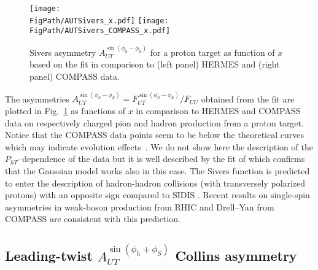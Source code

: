 \documentclass[a4paper,11pt]{article}
\newcommand*{\FigPath}{./figs}%
\begin{document}
\begin{figure}[t!]
\centering
\texttt{[image: \\FigPath/AUTSivers\_x.pdf]}  \hspace{5mm}
\texttt{[image: \\FigPath/AUTSivers\_COMPASS\_x.pdf]}
\caption{\label{aut_f1t_jlab} Sivers asymmetry
	$A_{UT}^{\sin(\phi_h-\phi_S)}$ for a proton target as function of $ x $
	based on the fit \cite{Anselmino:2011gs} in comparison to
	(left panel) HERMES \cite{Airapetian:2009ae}
	and (right panel) COMPASS  \cite{Adolph:2012sp} data.}
\end{figure}

The asymmetries $A_{UT}^{\sin(\phi_h-\phi_S)}= F_{UT}^{\sin(\phi_h-\phi_S)}/F_{UU}$
obtained from the fit \cite{Anselmino:2011gs}
are plotted in Fig.~\ref{aut_f1t_jlab} as functions of $x$ in comparison
to HERMES \cite{Airapetian:2009ae} and COMPASS \cite{Adolph:2012sp} data
on respectively charged pion and hadron production from a proton target.
	Notice that the COMPASS data points seem to be below the
	theoretical curves which may indicate evolution
	effects~\cite{Aybat:2011ta,Anselmino:2012aa}.
We do not show here the description of the $P_{hT}$--dependence of the
data but it is well described by the fit of \cite{Anselmino:2011gs}
which confirms that the Gaussian model works also in this case.
The Sivers function is predicted to enter the description of hadron-hadron 
collisions (with transversely polarized protons) with an opposite sign 
compared to SIDIS \cite{Collins:2002kn,Brodsky:2002cx,Brodsky:2002rv}.
Recent results on single-spin asymmetries in weak-boson production 
from RHIC \cite{Adamczyk:2015gyk} and Drell--Yan from COMPASS 
\cite{Aghasyan:2017jop,Parsamyan:2018zju} are consistent 
with this prediction.



\subsection{\boldmath Leading-twist $A_{UT}^{\sin(\phi_h+\phi_S)}$ Collins asymmetry}
\label{Sec-5.4:Collins-basis}
\end{document}
